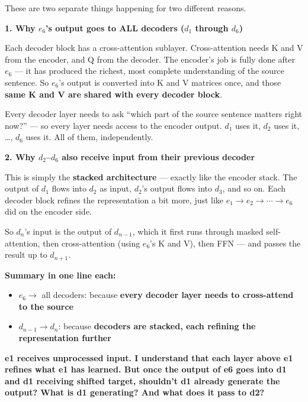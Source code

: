 \medskip

These are two separate things happening for two different reasons.

\bigskip

\textbf{1. Why $e_6$'s output goes to ALL decoders ($d_1$ through $d_6$)}

Each decoder block has a cross-attention sublayer. Cross-attention needs K and V from the encoder, and Q from the decoder. The encoder's job is fully done after $e_6$ --- it has produced the richest, most complete understanding of the source sentence. So $e_6$'s output is converted into K and V matrices once, and those \textbf{same K and V are shared with every decoder block}.

Every decoder layer needs to ask ``which part of the source sentence matters right now?'' --- so every layer needs access to the encoder output. $d_1$ uses it, $d_2$ uses it, \ldots, $d_6$ uses it. All of them, independently.

\bigskip

\textbf{2. Why $d_2$--$d_6$ also receive input from their previous decoder}

This is simply the \textbf{stacked architecture} --- exactly like the encoder stack. The output of $d_1$ flows into $d_2$ as input, $d_2$'s output flows into $d_3$, and so on. Each decoder block refines the representation a bit more, just like $e_1 \rightarrow e_2 \rightarrow \cdots \rightarrow e_6$ did on the encoder side.

So $d_n$'s input is the output of $d_{n-1}$, which it first runs through masked self-attention, then cross-attention (using $e_6$'s K and V), then FFN --- and passes the result up to $d_{n+1}$.

\bigskip

\textbf{Summary in one line each:}

\begin{itemize}
    \item $e_6 \rightarrow$ all decoders: because \textbf{every decoder layer needs to cross-attend to the source}
    \item $d_{n-1} \rightarrow d_n$: because \textbf{decoders are stacked, each refining the representation further}
\end{itemize}

\bigskip
\bigskip

\textbf{e1 receives unprocessed input. I understand that each layer above e1 refines what e1 has learned. But once the output of e6 goes into d1 and d1 receiving shifted target, shouldn't d1 already generate the output? What is d1 generating? And what does it pass to d2?}

